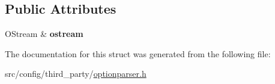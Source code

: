 \subsection*{Public Attributes}
\begin{DoxyCompactItemize}
\item 
\hypertarget{structxmem_1_1config_1_1third__party_1_1_print_usage_implementation_1_1_o_stream_writer_ab85a98667ea62652a59042c8ee354ab5}{}O\+Stream \& {\bfseries ostream}\label{structxmem_1_1config_1_1third__party_1_1_print_usage_implementation_1_1_o_stream_writer_ab85a98667ea62652a59042c8ee354ab5}

\end{DoxyCompactItemize}


The documentation for this struct was generated from the following file\+:\begin{DoxyCompactItemize}
\item 
src/config/third\+\_\+party/\hyperlink{optionparser_8h}{optionparser.\+h}\end{DoxyCompactItemize}
